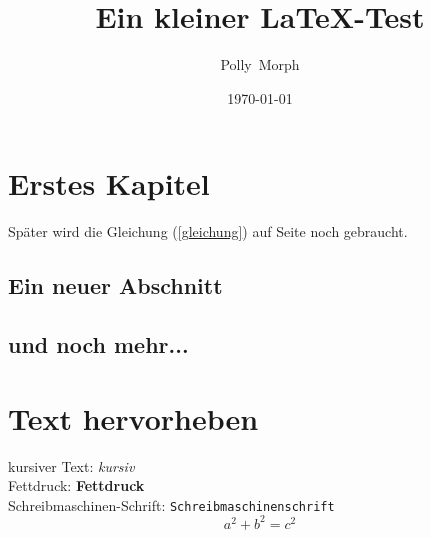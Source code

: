 \documentclass{book}
\begin{document}
\title{Ein kleiner \LaTeX-Test}
\author{Polly~Morph}
\date{\today}

\maketitle

\tableofcontents

\chapter{Erstes Kapitel}
Später wird die Gleichung (\ref{gleichung}) auf Seite \pageref{gleichung} noch gebraucht.
\section{Ein neuer Abschnitt}
\blindtext[5]
\section{und noch mehr...}
\blindtext[2]
\chapter{Text hervorheben}
kursiver Text: \textit{kursiv}\\
Fettdruck: \textbf{Fettdruck}\\
Schreibmaschinen-Schrift: \texttt{Schreibmaschinenschrift}
\begin{equation} \label{gleichung}
	a^2 + b^2 = c^2
\end{equation}
\end{document}
